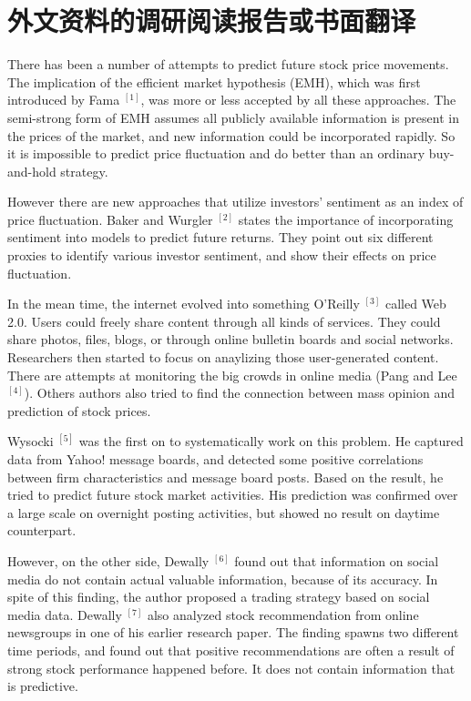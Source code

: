 \chapter{外文资料的调研阅读报告或书面翻译}

\noindent{}There has been a number of attempts to predict future stock price movements. The implication of the efficient market hypothesis (EMH), which was first introduced by Fama $^{[1]}$, was more or less accepted by all these approaches. The semi-strong form of EMH assumes all publicly available information is present in the prices of the market, and new information could be incorporated rapidly. So it is impossible to predict price fluctuation and do better than an ordinary buy-and-hold strategy.

However there are new approaches that utilize investors' sentiment as an index of price fluctuation. Baker and Wurgler $^{[2]}$ states the importance of incorporating sentiment into models to predict future returns. They point out six different proxies to identify various investor sentiment, and show their effects on price fluctuation.

In the mean time, the internet evolved into something O'Reilly $^{[3]}$ called Web 2.0. Users could freely share content through all kinds of services. They could share photos, files, blogs, or through online bulletin boards and social networks. Researchers then started to focus on anaylizing those user-generated content. There are attempts at monitoring the big crowds in online media (Pang and Lee $^{[4]}$). Others authors also tried to find the connection between mass opinion and prediction of stock prices.

Wysocki $^{[5]}$ was the first on to systematically work on this problem. He captured data from Yahoo! message boards, and detected some positive correlations between firm characteristics and message board posts. Based on the result, he tried to predict future stock market activities. His prediction was confirmed over a large scale on overnight posting activities, but showed no result on daytime counterpart.

However, on the other side, Dewally $^{[6]}$ found out that information on social media do not contain actual valuable information, because of its accuracy. In spite of this finding, the author proposed a trading strategy based on social media data. Dewally $^{[7]}$ also analyzed stock recommendation from online newsgroups in one of his earlier research paper. The finding spawns two different time periods, and found out that positive recommendations are often a result of strong stock performance happened before. It does not contain information that is predictive.

